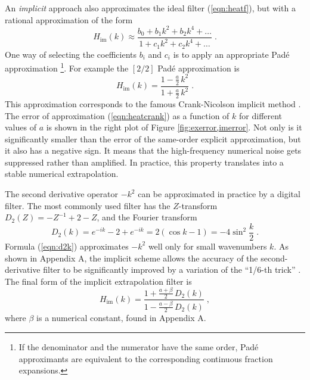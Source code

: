 \par
An \emph{implicit} approach also approximates the ideal filter
(\ref{eqn:heatf}), but with a rational approximation of the form
\begin{equation}
  \label{eqn:heatpade}
  H_{\mbox{im}} (k) \approx \frac{b_0 + b_1 k^2 + b_2 k^4 + \ldots}
  {1 + c_1 k^2 + c_2 k^4 + \ldots}
\;.
\end{equation}
One way of selecting the coefficients $b_i$ and $c_i$ is to apply an
appropriate Pad\'{e} approximation \cite[]{pade}\footnote{If the
  denominator and the numerator have the same order, Pad\'{e}
  approximants are equivalent to the corresponding continuous
  fraction expansions.}.  For example the $[2/2]$ Pad\'{e}
approximation is
\begin{equation}
  \label{eqn:heatcrank}
  H_{\mbox{im}} (k) =
  \frac{1 - \frac{a}{2}\,k^2}{1 + \frac{a}{2}\,k^2}
  \;.
\end{equation}
This approximation corresponds to the famous Crank-Nicolson implicit
method \cite[]{cn}. The error of approximation (\ref{eqn:heatcrank}) as
a function of $k$ for different values of $a$ is shown in the right
plot of Figure \ref{fig:exerror,imerror}. Not only is it significantly smaller
than the error of the same-order explicit approximation, but it also
has a negative sign. It means that the high-frequency numerical noise
gets suppressed rather than amplified. In practice, this property
translates into a stable numerical extrapolation.
\par
The second derivative operator $-k^2$ can be approximated in practice
by a digital filter. The most commonly used filter has the
$Z$-transform $D_2 (Z) = -Z^{-1} + 2 - Z$, and the Fourier transform
\begin{equation}
  \label{eqn:d2k}
  D_2 (k) = e^{-ik} - 2 + e^{-ik} = 2 (\cos{k} - 1) = -4
  \sin^2{\frac{k}{2}}\;.
\end{equation}
Formula (\ref{eqn:d2k}) approximates $-k^2$ well only for small
wavenumbers $k$. As shown in Appendix A, the implicit scheme allows
the accuracy of the second-derivative filter to be significantly
improved by a variation of the ``1/6-th trick''
\cite[]{Claerbout.blackwell.85}. The final form of the implicit
extrapolation filter is
\begin{equation}
  \label{eqn:heatfk}
   H_{\mbox{im}} (k) =
   \frac{1 + \frac{a+\beta}{2}\,D_2 (k)}{1 - \frac{a-\beta}{2}\,D_2 (k)}
   \;,
\end{equation}
where $\beta$ is a numerical constant, found in Appendix A.

